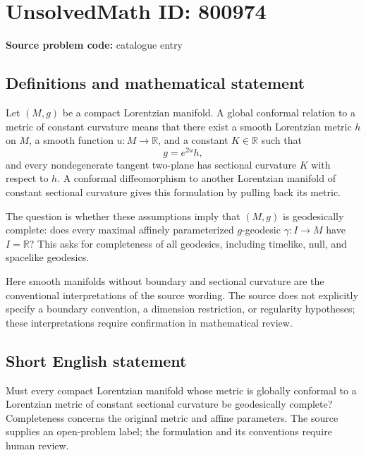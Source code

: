 \documentclass[11pt]{article}
\newcommand{\R}{\mathbb{R}}
\begin{document}
\section*{UnsolvedMath ID: 800974}
\textbf{Source problem code:} catalogue entry
\subsection{Definitions and mathematical statement}
Let \((M,g)\) be a compact Lorentzian manifold. A global conformal relation to a metric of constant curvature means that there exist a smooth Lorentzian metric \(h\) on \(M\), a smooth function \(u\colon M\to\R\), and a constant \(K\in\R\) such that
\[
g=e^{2u}h,
\]
and every nondegenerate tangent two-plane has sectional curvature \(K\) with respect to \(h\). A conformal diffeomorphism to another Lorentzian manifold of constant sectional curvature gives this formulation by pulling back its metric.

The question is whether these assumptions imply that \((M,g)\) is geodesically complete: does every maximal affinely parameterized \(g\)-geodesic \(\gamma\colon I\to M\) have \(I=\R\)? This asks for completeness of all geodesics, including timelike, null, and spacelike geodesics.

Here smooth manifolds without boundary and sectional curvature are the conventional interpretations of the source wording. The source does not explicitly specify a boundary convention, a dimension restriction, or regularity hypotheses; these interpretations require confirmation in mathematical review.
\subsection{Short English statement}
Must every compact Lorentzian manifold whose metric is globally conformal to a Lorentzian metric of constant sectional curvature be geodesically complete? Completeness concerns the original metric and affine parameters. The source supplies an open-problem label; the formulation and its conventions require human review.
\end{document}
